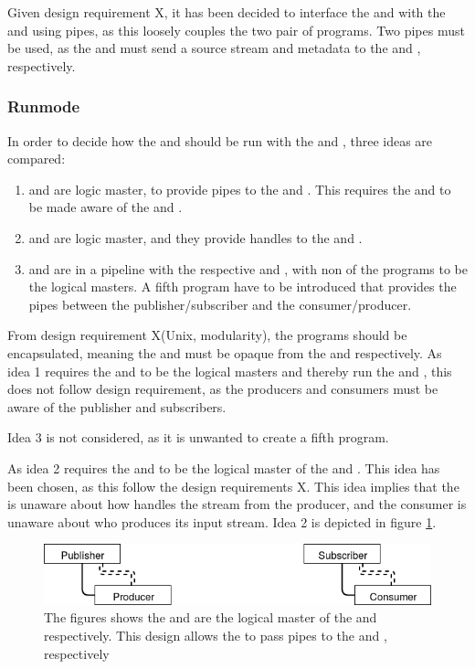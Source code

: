 Given design requirement X, it has been decided to interface the \pubs and \subs with the \pros{} and \cons{} using pipes, as this loosely couples the two pair of programs. Two pipes must be used, as the \pros{} and \subs{} must send a source stream and metadata to the \pubs{} and \cons, respectively.

\subsubsection*{Runmode}
In order to decide how the \pubs{} and \subs{} should be run with the \pros{} and \cons{}, three ideas are compared:
\begin{enumerate}
	\item \cons{} and \pros{} are logic master, to provide pipes to the \pubs{} and \subs{}. This requires the \cons{} and \pros{} to be made aware of the \subs{} and \pubs{}. 
	\item \subs{} and \pubs{} are logic master, and they provide handles to the \cons{} and \subs{}.
	\item \subs{} and \pubs{} are in a pipeline with the respective \cons{} and \pros{}, with non of the programs to be the logical masters. A fifth program have to be introduced that provides the pipes between the publisher/subscriber and the consumer/producer.
\end{enumerate}

From design requirement X(Unix, modularity), the programs should be encapsulated, meaning the \pubs{} and \subs{} must be opaque from the \cons{} and \pros{} respectively. As idea 1 requires the \cons{} and \pros{} to be the logical masters and thereby run the \pubs{} and \subs{}, this does not follow design requirement, as the producers and consumers must be aware of the publisher and subscribers.

Idea 3 is not considered, as it is unwanted to create a fifth program.

As idea 2 requires the \pubs{} and \subs{} to be the logical master of the \cons{} and \pros{}. This idea has been chosen, as this follow the design requirements X. This idea implies that the \pro{} is unaware about how handles the stream from the producer, and the consumer is unaware about who produces its input stream.  Idea 2 is depicted in figure \ref{fig:design:pubsub:runmode_master}.

\begin{figure}[H]
	\centering
	\includegraphics[width=1\textwidth]{figures/runmode_master}
	\caption{The figures shows the \pub{} and \sub{} are the logical master of the \pro{} and \con{} respectively. This design allows the \pubs{} to pass pipes to the \pro{} and \con{}, respectively} \label{fig:design:pubsub:runmode_master}
\end{figure}

